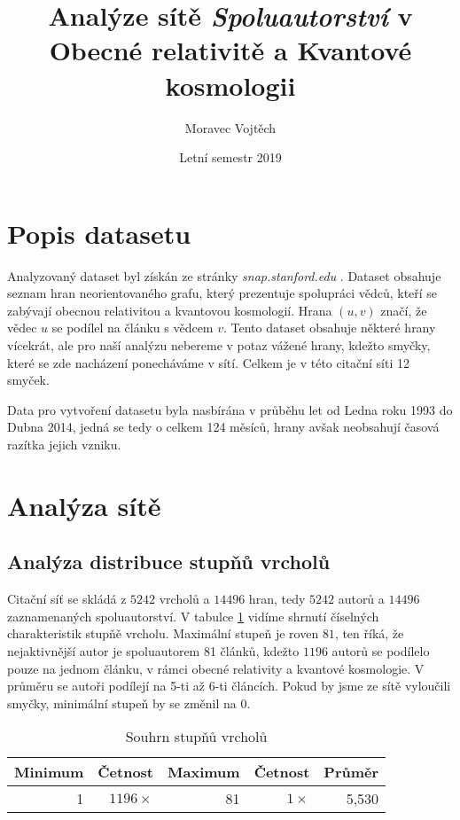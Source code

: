 \documentclass[a4paper,12pt]{article}
\author{Moravec Vojtěch}
\title{Analýze sítě \emph{Spoluautorství} v Obecné relativitě a Kvantové kosmologii}
\date{Letní semestr 2019}
\begin{document}
\maketitle
\newpage

\section{Popis datasetu}

Analyzovaný dataset byl získán ze stránky \emph{snap.stanford.edu} \cite{snapnets}. 
Dataset obsahuje seznam hran neorientovaného grafu, který prezentuje spolupráci vědců, kteří se zabývají obecnou relativitou a kvantovou kosmologií.
Hrana $(u,v)$ značí, že vědec $u$ se podílel na článku s vědcem $v$. Tento dataset obsahuje některé hrany vícekrát, ale pro naší analýzu nebereme v potaz
vážené hrany, kdežto smyčky, které se zde nacházení ponecháváme v sítí. Celkem je v této citační síti 12 smyček.

Data pro vytvoření datasetu byla nasbírána v průběhu let od Ledna roku 1993 do Dubna 2014, jedná se tedy o celkem 124 měsíců, hrany avšak neobsahují
časová razítka jejich vzniku.
 
\section{Analýza sítě}
\subsection{Analýza distribuce stupňů vrcholů}
Citační síť se skládá z $5242$ vrcholů a $14496$ hran, tedy $5242$ autorů a $14496$ zaznamenaných spoluautorství. V tabulce \ref{tab:vertexDeg} vidíme
shrnutí číselných charakteristik stupňě vrcholu. Maximální stupeň je roven $81$, ten říká, že nejaktivnější autor je spoluautorem 81 článků,
kdežto $1196$ autorů se podílelo pouze na jednom článku, v rámci obecné relativity a kvantové kosmologie. V průměru se autoři podílejí na 5-ti až 6-ti článcích.
Pokud by jsme ze sítě vyloučili smyčky, minimální stupeň by se změnil na $0$.

\begin{table}[h!]
    \centering
    \begin{tabular}{r | r | r | r | r}
        Minimum & Četnost       & Maximum   & Četnost       & Průměr \\\hline\hline
        1       & $1196 \times$ & 81        & $1 \times$    & 5,530  
    \end{tabular}
    \caption{Souhrn stupňů vrcholů}
    \label{tab:vertexDeg}
\end{table}
\end{document}
